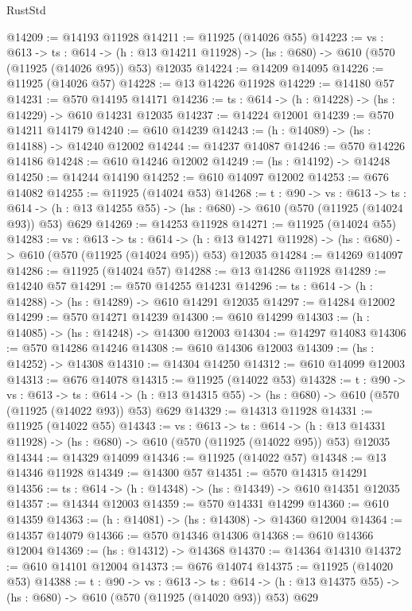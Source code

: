 \begin{lexlean}{RustStd}
\begin{coremodule}
@14209 := @14193 @11928
@14211 := @11925 (@14026 @55)
@14223 := {vs : @613} ->
  {ts : @614} ->
  (h : @13 @14211 @11928) -> (hs : @680) -> @610 (@570 (@11925 (@14026 @95)) @53) @12035
@14224 := @14209 @14095
@14226 := @11925 (@14026 @57)
@14228 := @13 @14226 @11928
@14229 := @14180 @57
@14231 := @570 @14195 @14171
@14236 := {ts : @614} -> (h : @14228) -> (hs : @14229) -> @610 @14231 @12035
@14237 := @14224 @12001
@14239 := @570 @14211 @14179
@14240 := @610 @14239
@14243 := (h : @14089) -> (hs : @14188) -> @14240 @12002
@14244 := @14237 @14087
@14246 := @570 @14226 @14186
@14248 := @610 @14246 @12002
@14249 := (hs : @14192) -> @14248
@14250 := @14244 @14190
@14252 := @610 @14097 @12002
@14253 := @676 @14082
@14255 := @11925 (@14024 @53)
@14268 := {t : @90} ->
  {vs : @613} ->
  {ts : @614} -> (h : @13 @14255 @55) -> (hs : @680) -> @610 (@570 (@11925 (@14024 @93)) @53) @629
@14269 := @14253 @11928
@14271 := @11925 (@14024 @55)
@14283 := {vs : @613} ->
  {ts : @614} ->
  (h : @13 @14271 @11928) -> (hs : @680) -> @610 (@570 (@11925 (@14024 @95)) @53) @12035
@14284 := @14269 @14097
@14286 := @11925 (@14024 @57)
@14288 := @13 @14286 @11928
@14289 := @14240 @57
@14291 := @570 @14255 @14231
@14296 := {ts : @614} -> (h : @14288) -> (hs : @14289) -> @610 @14291 @12035
@14297 := @14284 @12002
@14299 := @570 @14271 @14239
@14300 := @610 @14299
@14303 := (h : @14085) -> (hs : @14248) -> @14300 @12003
@14304 := @14297 @14083
@14306 := @570 @14286 @14246
@14308 := @610 @14306 @12003
@14309 := (hs : @14252) -> @14308
@14310 := @14304 @14250
@14312 := @610 @14099 @12003
@14313 := @676 @14078
@14315 := @11925 (@14022 @53)
@14328 := {t : @90} ->
  {vs : @613} ->
  {ts : @614} -> (h : @13 @14315 @55) -> (hs : @680) -> @610 (@570 (@11925 (@14022 @93)) @53) @629
@14329 := @14313 @11928
@14331 := @11925 (@14022 @55)
@14343 := {vs : @613} ->
  {ts : @614} ->
  (h : @13 @14331 @11928) -> (hs : @680) -> @610 (@570 (@11925 (@14022 @95)) @53) @12035
@14344 := @14329 @14099
@14346 := @11925 (@14022 @57)
@14348 := @13 @14346 @11928
@14349 := @14300 @57
@14351 := @570 @14315 @14291
@14356 := {ts : @614} -> (h : @14348) -> (hs : @14349) -> @610 @14351 @12035
@14357 := @14344 @12003
@14359 := @570 @14331 @14299
@14360 := @610 @14359
@14363 := (h : @14081) -> (hs : @14308) -> @14360 @12004
@14364 := @14357 @14079
@14366 := @570 @14346 @14306
@14368 := @610 @14366 @12004
@14369 := (hs : @14312) -> @14368
@14370 := @14364 @14310
@14372 := @610 @14101 @12004
@14373 := @676 @14074
@14375 := @11925 (@14020 @53)
@14388 := {t : @90} ->
  {vs : @613} ->
  {ts : @614} -> (h : @13 @14375 @55) -> (hs : @680) -> @610 (@570 (@11925 (@14020 @93)) @53) @629

\end{coremodule}
\end{lexlean}
